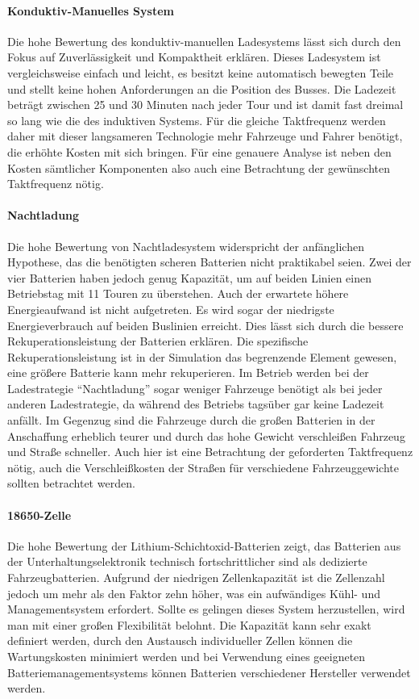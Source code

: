 \paragraph{Konduktiv-Manuelles System} Die hohe Bewertung des konduktiv-manuellen Ladesystems lässt sich durch den Fokus auf Zuverlässigkeit und Kompaktheit erklären. Dieses Ladesystem ist vergleichsweise einfach und leicht, es besitzt keine automatisch bewegten Teile und stellt keine hohen Anforderungen an die Position des Busses. Die Ladezeit beträgt zwischen 25 und 30 Minuten nach jeder Tour und ist damit fast dreimal so lang wie die des induktiven Systems. Für die gleiche Taktfrequenz werden daher mit dieser langsameren Technologie mehr Fahrzeuge und Fahrer benötigt, die erhöhte Kosten mit sich bringen. Für eine genauere Analyse ist neben den Kosten sämtlicher Komponenten also auch eine Betrachtung der gewünschten Taktfrequenz nötig.

\paragraph{Nachtladung} Die hohe Bewertung von Nachtladesystem widerspricht der anfänglichen Hypothese, das die benötigten scheren Batterien nicht praktikabel seien. Zwei der vier Batterien haben jedoch genug Kapazität, um auf beiden Linien einen Betriebstag mit 11 Touren zu überstehen. Auch der erwartete höhere Energieaufwand ist nicht aufgetreten. Es wird sogar der niedrigste Energieverbrauch auf beiden Buslinien erreicht. Dies lässt sich durch die bessere Rekuperationsleistung der Batterien erklären. Die spezifische Rekuperationsleistung ist in der Simulation das begrenzende Element gewesen, eine größere Batterie kann mehr rekuperieren. Im Betrieb werden bei der Ladestrategie "`Nachtladung"' sogar weniger Fahrzeuge benötigt als bei jeder anderen Ladestrategie, da während des Betriebs tagsüber gar keine Ladezeit anfällt. Im Gegenzug sind die Fahrzeuge durch die großen Batterien in der Anschaffung erheblich teurer und durch das hohe Gewicht verschleißen Fahrzeug und Straße schneller. Auch hier ist eine Betrachtung der geforderten Taktfrequenz nötig, auch die Verschleißkosten der Straßen für verschiedene Fahrzeuggewichte sollten betrachtet werden.

\paragraph{18650-Zelle} Die hohe Bewertung der Lithium-Schichtoxid-Batterien zeigt, das Batterien aus der Unterhaltungselektronik technisch fortschrittlicher sind als dedizierte Fahrzeugbatterien. Aufgrund der niedrigen Zellenkapazität ist die Zellenzahl jedoch um mehr als den Faktor zehn höher, was ein aufwändiges Kühl- und Managementsystem erfordert. Sollte es gelingen dieses System herzustellen, wird man mit einer großen Flexibilität belohnt. Die Kapazität kann sehr exakt definiert werden, durch den Austausch individueller Zellen können die Wartungskosten minimiert werden und bei Verwendung eines geeigneten Batteriemanagementsystems können Batterien verschiedener Hersteller verwendet werden.

